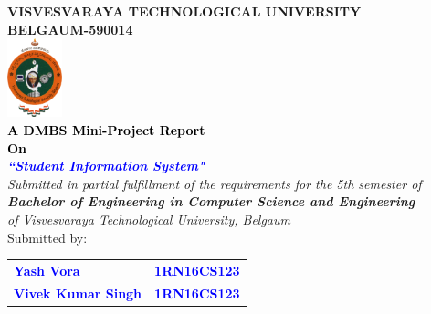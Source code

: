 \thispagestyle{empty}
\begin{titlepage}
\begin{center}
\textup{\large {\textcolor{darkbrown}{\bf VISVESVARAYA TECHNOLOGICAL UNIVERSITY} \\ {\textcolor{darkbrown}{\bf BELGAUM-590014}}}}\\
\includegraphics[width=0.12\textwidth]{./../static/media/VTU.png}\\
\textup{\small {\textcolor{black}{\textbf {A DMBS Mini-Project Report} \\ {\textbf {On}}}}} \\
\textup{\large {\textcolor{blue}{\textbf {\textit {``Student Information System"}}}}} \\[0.2in]
\textup{{\textit {Submitted in partial fulfillment of the requirements for the 5th semester of} \\ {\textbf {\textit {Bachelor of Engineering in Computer Science and Engineering}} \\ \textit {of Visvesvaraya Technological University, Belgaum}}}}\\


\textup{{Submitted by:}} 
\break\break
\begin{tabular}{l l}
\textcolor{blue}{\textbf{Yash Vora}} & \textcolor{blue}{\hspace{2.7cm}\textbf{1RN16CS123}}\\ 
\textcolor{blue}{\textbf{Vivek Kumar Singh}} & \textcolor{blue}{\hspace{2.7cm}\textbf{1RN16CS123}}\\ 
\end{tabular}

\vfill


\end{center}
\end{titlepage}
